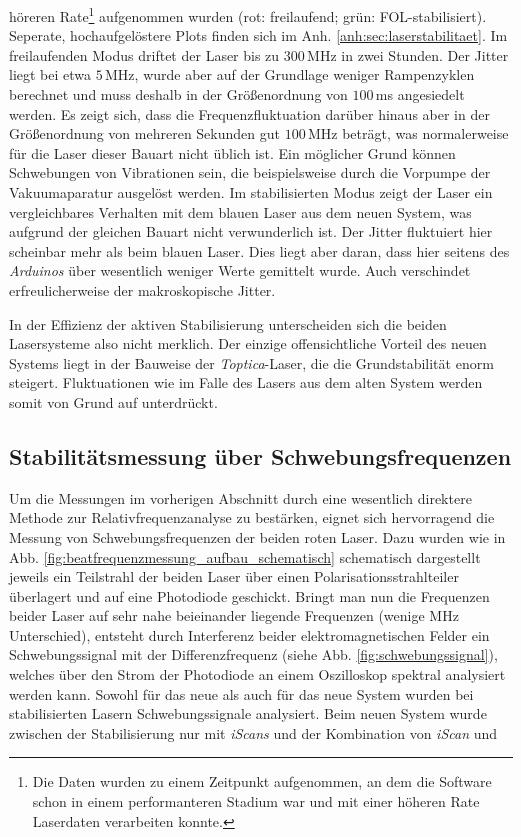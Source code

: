 höreren Rate\footnote{Die Daten wurden zu einem Zeitpunkt aufgenommen, an dem die Software schon in einem performanteren
Stadium war und mit einer höheren Rate Laserdaten verarbeiten konnte.}
aufgenommen wurden (rot: freilaufend;
grün: FOL-stabilisiert). Seperate, hochaufgelöstere Plots finden sich im Anh.
\ref{anh:sec:laserstabilitaet}. Im freilaufenden Modus driftet der Laser bis
zu $300\,$MHz in zwei Stunden. Der Jitter liegt bei etwa $5\,$MHz, wurde
aber auf der Grundlage weniger Rampenzyklen berechnet und muss deshalb in der
Größenordnung von $100\,$ms angesiedelt werden. Es zeigt sich, dass die
Frequenzfluktuation darüber hinaus aber in der Größenordnung von mehreren
Sekunden gut $100\,$MHz beträgt, was normalerweise für die Laser dieser Bauart
nicht üblich ist. Ein möglicher Grund können Schwebungen von Vibrationen sein,
die beispielsweise durch die Vorpumpe der Vakuumaparatur ausgelöst werden. Im
stabilisierten Modus zeigt der Laser ein vergleichbares Verhalten mit
dem blauen Laser aus dem neuen System, was aufgrund der gleichen Bauart nicht
verwunderlich ist. Der Jitter fluktuiert hier scheinbar mehr als beim blauen
Laser. Dies liegt aber daran, dass hier seitens des \textit{Arduinos} über
wesentlich weniger Werte gemittelt wurde. Auch verschindet erfreulicherweise der
makroskopische Jitter.\par
In der Effizienz der aktiven Stabilisierung unterscheiden sich die beiden
Lasersysteme also nicht merklich. Der einzige offensichtliche Vorteil des neuen
Systems liegt in der Bauweise der \textit{Toptica}-Laser, die die
Grundstabilität enorm steigert. Fluktuationen wie im Falle des Lasers aus dem
alten System werden somit von Grund auf unterdrückt.

\subsection{Stabilitätsmessung über
Schwebungsfrequenzen}\label{subsec:beatfrequenzmessung}
Um die Messungen im vorherigen Abschnitt durch eine wesentlich direktere
Methode zur Relativfrequenzanalyse zu bestärken, eignet sich hervorragend die
Messung von Schwebungsfrequenzen der beiden roten Laser. Dazu wurden wie in Abb.
\ref{fig:beatfrequenzmessung_aufbau_schematisch} schematisch dargestellt jeweils
ein Teilstrahl der beiden Laser über einen Polarisationsstrahlteiler
überlagert und auf eine Photodiode geschickt. Bringt man nun die Frequenzen
beider Laser auf sehr nahe beieinander liegende Frequenzen (wenige MHz
Unterschied), entsteht durch Interferenz beider
elektromagnetischen Felder ein Schwebungssignal mit der Differenzfrequenz
(siehe Abb. \ref{fig:schwebungssignal}), welches über den Strom der Photodiode
an einem Oszilloskop spektral analysiert werden kann.
Sowohl für das neue als auch für das neue System wurden bei
stabilisierten Lasern Schwebungssignale analysiert. Beim neuen System wurde
zwischen der Stabilisierung nur mit \textit{iScans} und der Kombination von
\textit{iScan} und 
